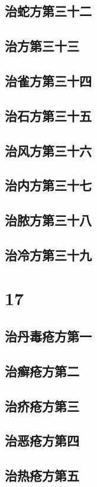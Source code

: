 \documentclass[a4paper,12pt,UTF8,twoside]{ctexbook}
\begin{document}
\chapter{治蛇方第三十二}
\chapter{治方第三十三}
\chapter{治雀方第三十四}
\chapter{治石方第三十五}
\chapter{治风方第三十六}
\chapter{治内方第三十七}
\chapter{治脓方第三十八}
\chapter{治冷方第三十九}

\part{17}
\chapter{治丹毒疮方第一}
\chapter{治癣疮方第二}
\chapter{治疥疮方第三}
\chapter{治恶疮方第四}
\chapter{治热疮方第五}
\end{document}
